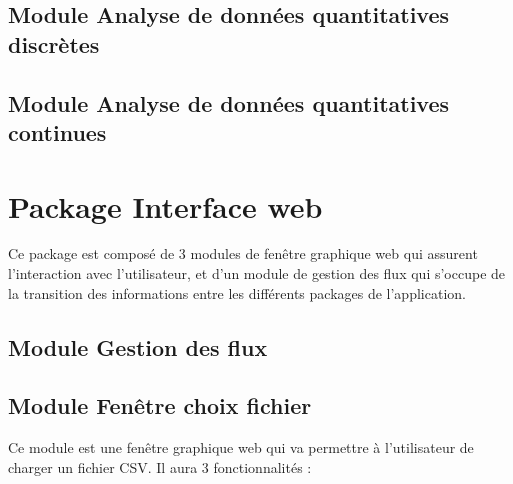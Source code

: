 		\subsection{Module Analyse de données quantitatives discrètes}
			
		\subsection{Module Analyse de données quantitatives continues}
		
		
	\section{Package Interface web}
		Ce package est composé de 3 modules de fenêtre graphique web qui assurent l'interaction avec l'utilisateur, et d'un module de gestion des flux qui s'occupe de la transition des informations entre les différents packages de l'application.
		
		\subsection{Module Gestion des flux}
		
		\subsection{Module Fenêtre choix fichier}
		Ce module est une fenêtre graphique web qui va permettre à l'utilisateur de charger un fichier CSV. Il aura 3 fonctionnalités :

